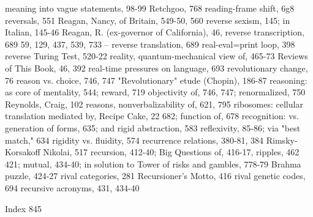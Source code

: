  meaning into vague statements, 98-99          Retchgoo, 768
 reading-frame shift, 6g8                      reversals, 551
Reagan, Nancy, of Britain, 549-50, 560         reverse sexism, 145; in Italian, 145-46
Reagan, R. (ex-governor of California), 46,    reverse transcription, 689
 59, 129, 437, 539, 733 –                      reverse translation, 689
real-eval=print loop, 398                      reverse Turing Test, 520-22
reality, quantum-mechanical view of, 465-73 Reviews of This Book, 46, 392
real-time pressures on language, 693           revolutionary change, 76
reason vs. choice, 746, 747                    "Revolutionary" etude (Chopin), 186-87
reasoning: as core of mentality, 544;          reward, 719
 objectivity of, 746, 747; renormalized, 750   Reynolds, Craig, 102
reasons, nonverbalizability of, 621, 795       ribosomes: cellular translation mediated by,
Recipe Cake, 22                                  682; function of, 678
recognition: vs. generation of forms, 635; and rigid abstraction, 583
 reflexivity, 85-86; via "best match," 634     rigidity vs. fluidity, 574
recurrence relations, 380-81, 384              Rimsky-Korsakoff Nikolai, 517
recursion, 412-40; Big Questions of, 416-17,   ripples, 462
 421; mutual, 434-40; in solution to Tower of risks and gambles, 778-79
 Brahma puzzle, 424-27                         rival categories, 281
Recursioner's Motto, 416                       rival genetic codes, 694
recursive acronyms, 431, 434-40

 Index                                                                                     845

